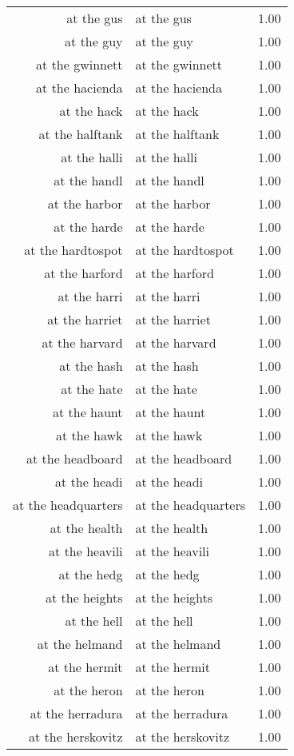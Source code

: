 \begin{table}[ht]
\begin{tabular}{rlr}
  at the gus & at the gus & 1.00 \\ 
  at the guy & at the guy & 1.00 \\ 
  at the gwinnett & at the gwinnett & 1.00 \\ 
  at the hacienda & at the hacienda & 1.00 \\ 
  at the hack & at the hack & 1.00 \\ 
  at the halftank & at the halftank & 1.00 \\ 
  at the halli & at the halli & 1.00 \\ 
  at the handl & at the handl & 1.00 \\ 
  at the harbor & at the harbor & 1.00 \\ 
  at the harde & at the harde & 1.00 \\ 
  at the hardtospot & at the hardtospot & 1.00 \\ 
  at the harford & at the harford & 1.00 \\ 
  at the harri & at the harri & 1.00 \\ 
  at the harriet & at the harriet & 1.00 \\ 
  at the harvard & at the harvard & 1.00 \\ 
  at the hash & at the hash & 1.00 \\ 
  at the hate & at the hate & 1.00 \\ 
  at the haunt & at the haunt & 1.00 \\ 
  at the hawk & at the hawk & 1.00 \\ 
  at the headboard & at the headboard & 1.00 \\ 
  at the headi & at the headi & 1.00 \\ 
  at the headquarters & at the headquarters & 1.00 \\ 
  at the health & at the health & 1.00 \\ 
  at the heavili & at the heavili & 1.00 \\ 
  at the hedg & at the hedg & 1.00 \\ 
  at the heights & at the heights & 1.00 \\ 
  at the hell & at the hell & 1.00 \\ 
  at the helmand & at the helmand & 1.00 \\ 
  at the hermit & at the hermit & 1.00 \\ 
  at the heron & at the heron & 1.00 \\ 
  at the herradura & at the herradura & 1.00 \\ 
  at the herskovitz & at the herskovitz & 1.00 \\ 

\end{tabular}
\end{table}
